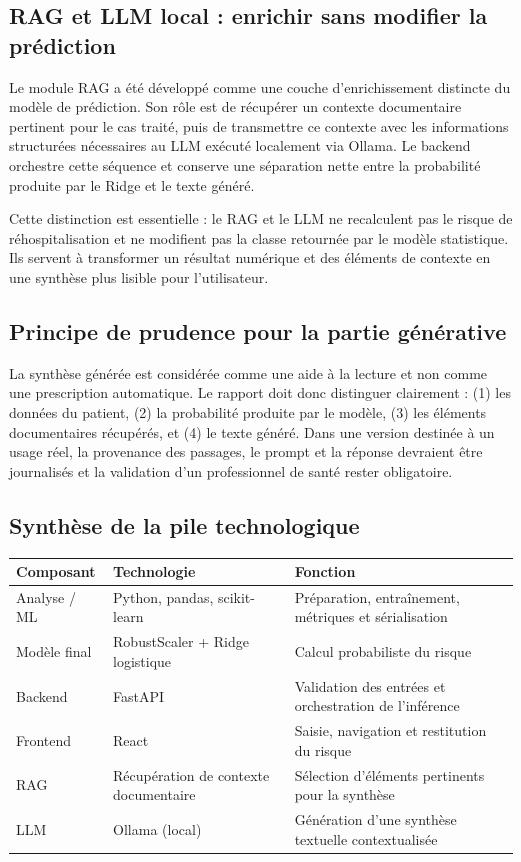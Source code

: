 \documentclass[12pt,a4paper]{report}
\begin{document}
\subsection{RAG et LLM local : enrichir sans modifier la prédiction}

Le module RAG a été développé comme une couche d'enrichissement distincte du modèle de
prédiction. Son rôle est de récupérer un contexte documentaire pertinent pour le cas
traité, puis de transmettre ce contexte avec les informations structurées nécessaires au
LLM exécuté localement via Ollama. Le backend orchestre cette séquence et conserve une
séparation nette entre la probabilité produite par le Ridge et le texte généré.

Cette distinction est essentielle : le RAG et le LLM ne recalculent pas le risque de
réhospitalisation et ne modifient pas la classe retournée par le modèle statistique. Ils
servent à transformer un résultat numérique et des éléments de contexte en une synthèse
plus lisible pour l'utilisateur.

\subsection{Principe de prudence pour la partie générative}

La synthèse générée est considérée comme une aide à la lecture et non comme une prescription
automatique. Le rapport doit donc distinguer clairement : (1) les données du patient,
(2) la probabilité produite par le modèle, (3) les éléments documentaires récupérés, et
(4) le texte généré. Dans une version destinée à un usage réel, la provenance des passages,
le prompt et la réponse devraient être journalisés et la validation d'un professionnel de
santé rester obligatoire.

\subsection{Synthèse de la pile technologique}

\begin{center}
\renewcommand{\arraystretch}{1.2}
\begin{tabularx}{\linewidth}{@{}l l X@{}}
\toprule
\textbf{Composant} & \textbf{Technologie} & \textbf{Fonction} \\
\midrule
Analyse / ML & Python, pandas, scikit-learn & Préparation, entraînement, métriques et sérialisation \\
Modèle final & RobustScaler + Ridge logistique & Calcul probabiliste du risque \\
Backend & FastAPI & Validation des entrées et orchestration de l'inférence \\
Frontend & React & Saisie, navigation et restitution du risque \\
RAG & Récupération de contexte documentaire & Sélection d'éléments pertinents pour la synthèse \\
LLM & Ollama (local) & Génération d'une synthèse textuelle contextualisée \\
\bottomrule
\end{tabularx}
\end{center}
\end{document}

